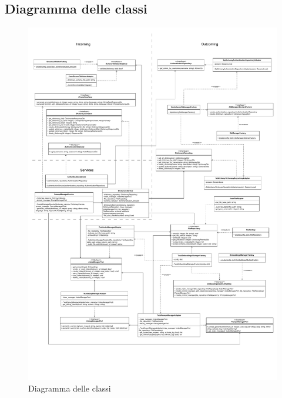 \subsection{Diagramma delle classi}

\begin{figure}[H]
  \centering
  \includegraphics[width=\textwidth]{assets/Backend/diagramma_classi.pdf}
  \caption{Diagramma delle classi}
\end{figure}